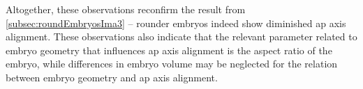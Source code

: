 Altogether, these observations reconfirm the result from \autoref{subsec:roundEmbryosIma3} -- rounder embryos indeed show diminished \ac{ap} axis alignment. These observations also indicate that the relevant parameter related to embryo geometry that influences \ac{ap} axis alignment is the aspect ratio of the embryo, while differences in embryo volume may be neglected for the relation between embryo geometry and \ac{ap} axis alignment. 



